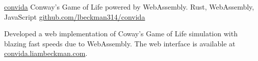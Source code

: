 \showoff
{\textcolor{my-blue}{\href{https://convida.liambeckman.com/}{convida}}}
{Conway's Game of Life powered by WebAssembly.}
{Rust, WebAssembly, JavaScript}
{\textcolor{my-blue}{\href{https://github.com/lbeckman314/convida}{github.com/lbeckman314/convida}}}

Developed a web implementation of Coway's Game of Life simulation with blazing fast speeds due to WebAssembly. The web interface is available at \textcolor{my-blue}{\href{https://convida.liambeckman.com}{convida.liambeckman.com}}.

\myBreak
